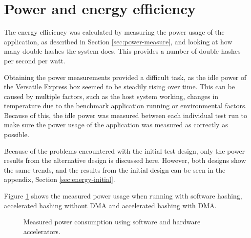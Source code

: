 \section{Power and energy efficiency}

The energy efficiency was calculated by measuring the power usage of the application, as described in Section \ref{sec:power-measure},
and looking at how many double hashes the system does. This provides a number of double hashes per second per watt.

Obtaining the power measurements provided a difficult task, as the idle power of the Versatile Express box seemed to be
steadily rising over time. This can be caused by multiple factors, such as the host system working, changes in temperature
due to the benchmark application running or environmental factors. Because of this, the idle power was measured between
each individual test run to make sure the power usage of the application was measured as correctly as possible.

Because of the problems encountered with the initial test design, only the power results from the alternative design
is discussed here. However, both designs show the same trends, and the results from the initial design can be seen in
the appendix, Section \ref{sec:energy-initial}.

Figure \ref{fig:power-plot} shows the measured power usage when running with software hashing, accelerated hashing without DMA
and accelerated hashing with DMA.

\begin{figure}
	\centering
	\caption{Measured power consumption using software and hardware accelerators.}
	\label{fig:power-plot}
\end{figure}

